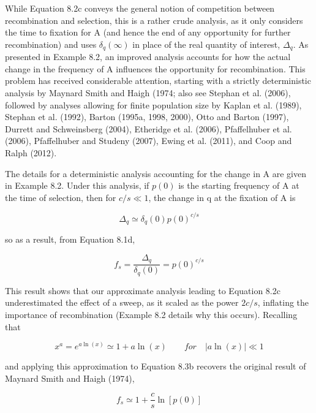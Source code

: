 \documentclass{article}
\begin{document}
While Equation 8.2c conveys the general notion of competition between recombination and selection, this is a rather crude analysis, as it only considers the time to fixation for A (and hence the end of any opportunity for further recombination) and uses  $ \delta_q(\infty) $ in place of the real quantity of interest,  $ \Delta_q $. As presented in Example 8.2, an improved analysis accounts for how the actual change in the frequency of A influences the opportunity for recombination. This problem has received considerable attention, starting with a strictly deterministic analysis by Maynard Smith and Haigh (1974; also see Stephan et al. (2006), followed by analyses allowing for finite population size by Kaplan et al. (1989), Stephan et al. (1992), Barton (1995a, 1998, 2000), Otto and Barton (1997), Durrett and Schweinsberg (2004), Etheridge et al. (2006), Pfaffelhuber et al. (2006), Pfaffelhuber and Studeny (2007), Ewing et al. (2011), and Coop and Ralph (2012).

The details for a deterministic analysis accounting for the change in A are given in Example 8.2. Under this analysis, if  $ p(0) $ is the starting frequency of A at the time of selection, then for  $ c/s \ll 1 $, the change in q at the fixation of A is

\begin{equation}
\Delta_{q}\simeq\delta_{q}(0)p(0)^{c/s}
\tag{8.3a}
\label{eq:8_3a}
\end{equation}

so as a result, from Equation 8.1d,

\begin{equation}
f_{s}=\frac{\Delta_{q}}{\delta_{q}(0)}=p(0)^{c/s}
\tag{8.3b}
\label{eq:8_3b}
\end{equation}

This result shows that our approximate analysis leading to Equation 8.2c underestimated the effect of a sweep, as it scaled as the power  $ 2c/s $, inflating the importance of recombination (Example 8.2 details why this occurs). Recalling that

\begin{equation}
x^{a}=e^{a\ln(x)}\simeq1+a\ln(x)\qquad for\quad|a\ln(x)|\ll1
\tag{8.3c}
\label{eq:8_3c}
\end{equation}

and applying this approximation to Equation 8.3b recovers the original result of Maynard Smith and Haigh (1974),

\begin{equation}
f_{s}\simeq1+\frac{c}{s}\ln\left[p(0)\right]
\tag{8.3d}
\label{eq:8_3d}
\end{equation}
\end{document}
